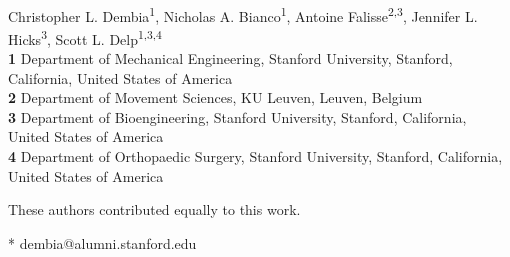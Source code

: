 \documentclass[10pt,letterpaper]{article}
\begin{document}
\vspace*{0.2in}

\begin{flushleft}
{\Large
\textbf{} %
}
\newline
\\
Christopher L. Dembia\textsuperscript{1\Yinyang*},
Nicholas A. Bianco\textsuperscript{1\Yinyang},
Antoine Falisse\textsuperscript{2,3},
Jennifer L. Hicks\textsuperscript{3},
Scott L. Delp\textsuperscript{1,3,4}
\\
\bigskip
\textbf{1} Department of Mechanical Engineering, Stanford University, Stanford, California, United States of America
\\
\textbf{2} Department of Movement Sciences, KU Leuven, Leuven, Belgium
\\
\textbf{3} Department of Bioengineering, Stanford University, Stanford, California, United States of America
\\
\textbf{4} Department of Orthopaedic Surgery, Stanford University, Stanford, California, United States of America
\\
\bigskip

%
%
\Yinyang These authors contributed equally to this work.





* dembia@alumni.stanford.edu

\end{flushleft}
\end{document}
